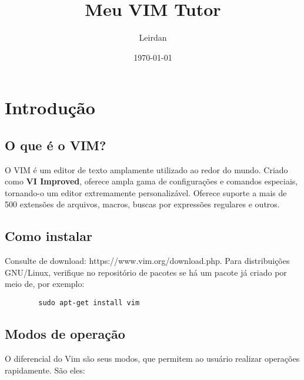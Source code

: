 \documentclass[12pt]{article}
\title{Meu VIM Tutor}
\author{Leirdan}
\date{\today}
\begin{document}
\maketitle

\section{Introdução}
	\subsection{O que é o VIM?}
	O VIM é um editor de texto amplamente utilizado ao redor do mundo. Criado como \textbf{VI Improved}, oferece ampla gama de configurações e comandos especiais, tornando-o um editor extremamente personalizável. Oferece suporte a mais de 500 extensões de arquivos, macros, buscas por expressões regulares e outros. 
	\subsection{Como instalar}
	Consulte de download: https://www.vim.org/download.php. Para distribuições GNU/Linux, verifique no repositório de pacotes se há um pacote já criado por meio de, por exemplo:
	\begin{lstlisting}
		sudo apt-get install vim
	\end{lstlisting}
	\subsection{Modos de operação}
	O diferencial do Vim são seus modos, que permitem ao usuário realizar operações rapidamente. São eles:
\end{document}
